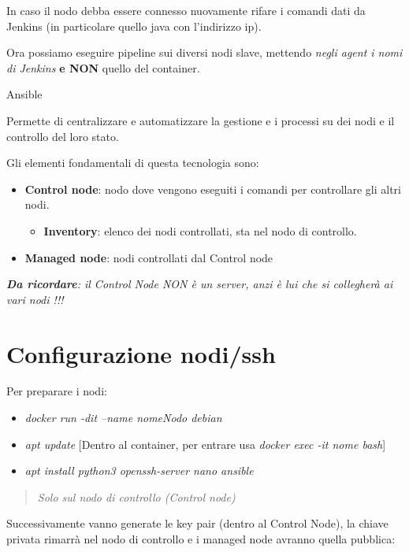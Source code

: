 In caso il nodo debba essere connesso nuovamente rifare i comandi dati
da Jenkins (in particolare quello java con l'indirizzo ip).

Ora possiamo eseguire pipeline sui diversi nodi slave, mettendo
\emph{negli agent i nomi di Jenkins} \textbf{e NON} quello del
container.

Ansible

Permette di centralizzare e automatizzare la gestione e i processi su
dei nodi e il controllo del loro stato.

Gli elementi fondamentali di questa tecnologia sono:

\begin{itemize}
\item
  \textbf{Control node}: nodo dove vengono eseguiti i comandi per
  controllare gli altri nodi.

  \begin{itemize}
  \item
    \textbf{Inventory}: elenco dei nodi controllati, sta nel nodo di
    controllo.
  \end{itemize}
\item
  \textbf{Managed node}: nodi controllati dal Control node
\end{itemize}

\emph{\textbf{Da ricordare}: il Control Node NON è un server, anzi è lui
che si collegherà ai vari nodi !!!}

\section{Configurazione nodi/ssh}\label{configurazione-nodissh}

Per preparare i nodi:

\begin{itemize}
\item
  \emph{docker run -dit --name nomeNodo debian}
\item
  \emph{apt update} {[}Dentro al container, per entrare usa \emph{docker
  exec -it nome bash}{]}
\item
  \emph{apt install python3 openssh-server nano ansible}
\end{itemize}

\begin{quote}
\emph{Solo sul nodo di controllo (Control node)}
\end{quote}

Successivamente vanno generate le key pair (dentro al Control Node), la
chiave privata rimarrà nel nodo di controllo e i managed node avranno
quella pubblica:

